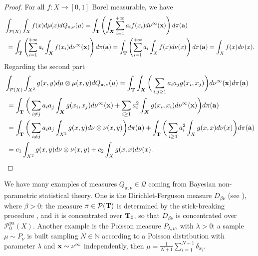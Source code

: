 \documentclass[10pt,leqno]{amsart}
\numberwithin{equation}{section}
\newcommand{\Q}{\mathbb{Q}}
\newcommand{\N}{\mathbb{N}}
\newcommand{\PP}{\mathcal{P}}
\renewcommand{\Q}{Q}
\begin{document}
\begin{proof}
    For all $f: X  \to [0,1]$ Borel measurable, we have
    \begin{align*}
        & \int_{\PP( X )}\int_{ X } f(x) d\mu(x) d\Q_{\pi,\nu}(\mu) = \int_{\bold{T}} \left(\int_{\boldsymbol{X}}\sum_{i=1}^{+\infty} a_i f(x_i) d\nu^{\infty}(\bold{x})\right)d\pi(\bold{a})
        \\
        & \ =  
        \int_{\bold{T}} \left(\sum_{i=1}^{+\infty} a_i \int_{\boldsymbol{X}}f(x_i) d\nu^{\infty}(\bold{x})\right)d\pi(\bold{a})
        = 
        \int_{\bold{T}} \left(\sum_{i=1}^{+\infty} a_i \int_{ X }f(x) d\nu(x)\right)d\pi(\bold{a})
        =  \int_{ X } f(x)d\nu(x).
    \end{align*}
    Regarding the second part 
    \begin{align*}
        & \int_{\PP( X )}\int_{X^2} g(x,y) d\mu\otimes \mu(x,y) d\Q_{\pi,\nu}(\mu) 
        = 
        \int_{\bold{T}} \int_{\boldsymbol{X}} \bigg( \sum_{i,j\geq 1} a_ia_j g(x_i,x_j) \bigg) d\nu^{\infty}(\bold{x}) d\pi(\bold{a})
        \\
        & \ =
        \int_{\bold{T}} \bigg(\sum_{i\neq j} a_ia_j \int_{\boldsymbol{X}} g(x_i,x_j) d\nu^\infty(\bold{x}) + \sum_{i\geq 1} a_i^2\int_{\boldsymbol{X}} g(x_i,x_i) d\nu^\infty(\bold{x}) \bigg)d\pi(\bold{a})
        \\
        & \ =
        \int_{\bold{T}} \bigg(\sum_{i\neq j} a_ia_j \int_{X^2} g(x,y) d\nu\otimes\nu(x,y) \bigg) d\pi(\bold{a}) + \int_{\bold{T}} \bigg(\sum_{i\geq 1} a_i^2\int_{ X } g(x,x) d\nu(x) \bigg) d\pi(\bold{a})
        \\
        & \ =
        c_1 \int_{X^2} g(x,y) d\nu\otimes\nu(x,y) + c_2 \int_{ X } g(x,x) d\nu(x). 
        \qedhere
    \end{align*}
\end{proof}

    We have many examples of measures $\Q_{\pi,\nu}\in \mathcal{Q}$ coming from Bayesian non-parametric statistical theory. One is the Dirichlet-Ferguson measure $D_{\beta\nu}$ (see \cite{ferguson1973bayesian, dello2022dirichlet}), where $\beta>0$: the measure $\pi\in \PP(\bold{T})$ is determined by the stick-breaking procedure \cite{sethuraman1994constructive}, and it is concentrated over $\bold{T}_0$, so that $D_{\beta \nu}$ is concentrated over $\PP^{\operatorname{pa}}_0( X )$.
    Another example is the Poisson measure $P_{\lambda,\nu}$, with $\lambda>0$: a sample $\mu \sim P_\nu$ is built sampling $N\in \N$ according to a Poisson distribution with parameter $\lambda$ and $\bold{x} \sim \nu^\infty$ independently, then $\mu= \frac{1}{N+1} \sum_{i=1}^{N+1} \delta_{x_i}$.
\end{document}
